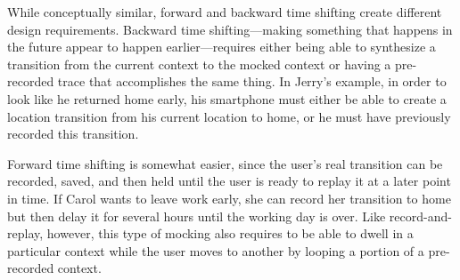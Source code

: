 While conceptually similar, forward and backward time shifting create
different design requirements. Backward time shifting---making something that
happens in the future appear to happen earlier---requires either being able
to synthesize a transition from the current context to the mocked context or
having a pre-recorded trace that accomplishes the same thing. In Jerry's
example, in order to look like he returned home early, his smartphone must
either be able to create a location transition from his current location to
home, or he must have previously recorded this transition.

Forward time shifting is somewhat easier, since the user's real transition can
be recorded, saved, and then held until the user is ready to replay it at a
later point in time. If Carol wants to leave work early, she can record her
transition to home but then delay it for several hours until the working day
is over. Like record-and-replay, however, this type of mocking also requires
\PocketMocker{} to be able to dwell in a particular context while the user
moves to another by looping a portion of a pre-recorded context.
